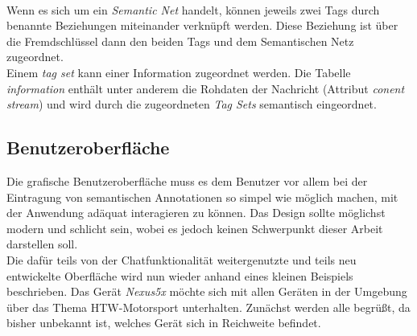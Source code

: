 \\Wenn es sich um ein \textit{Semantic Net} handelt, können jeweils zwei Tags durch benannte Beziehungen miteinander verknüpft werden. Diese Beziehung ist über die Fremdschlüssel dann den beiden Tags und dem Semantischen Netz zugeordnet. 
\\Einem \textit{tag set} kann einer Information zugeordnet werden. Die Tabelle \textit{information} enthält unter anderem die Rohdaten der Nachricht (Attribut \textit{conent stream}) und wird durch die zugeordneten \textit{Tag Sets} semantisch eingeordnet. 
\newline [...]
\newpage

\subsection{Benutzeroberfläche}
Die grafische Benutzeroberfläche muss es dem Benutzer vor allem bei der Eintragung von semantischen Annotationen so simpel wie möglich machen, mit der Anwendung adäquat interagieren zu können. Das Design sollte möglichst modern und schlicht sein, wobei es jedoch keinen Schwerpunkt dieser Arbeit darstellen soll. 
\\Die dafür teils von der Chatfunktionalität weitergenutzte und teils neu entwickelte Ober\-flä\-che wird nun wieder anhand eines kleinen Beispiels beschrieben. Das Gerät \textit{Nexus5x} möchte sich mit allen Geräten in der Umgebung über das Thema HTW-Motorsport unterhalten. Zunächst werden alle begrüßt, da bisher unbekannt ist, welches Gerät sich in Reichweite befindet.\newline\newline
\hspace*{0cm}

